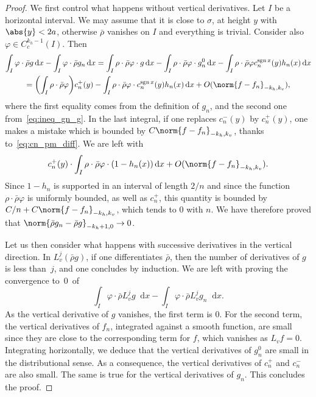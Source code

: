 \documentclass[JEP,XML,SOM,Unicode]{cedram}
\newcommand{\dd}{\mathop{}\!\mathrm{d}}
\newcommand{\paregg}[1]{\biggl(#1\biggr)}
\DeclareMathOperator{\sgn}{sgn}
\let\phi\varphi
\theoremstyle{definition}
\numberwithin{equation}{section}
\begin{document}
\begin{proof}
We first control what happens without vertical derivatives. Let $I$ be a
horizontal interval. We may assume that it is close to $\sigma$, at height
$y$ with $\abs{y}<2a$, otherwise $\bar\rho$ vanishes on $I$ and everything is
trivial. Consider also $\phi \in C^{k_h-1}_c(I)$. Then
\begin{multline*}
\int_I \phi \cdot \bar\rho g \dd x - \int_I \phi \cdot \bar\rho g_n \dd x
= \int_I \rho \cdot \bar\rho \phi \cdot g \dd x - \int_I \rho \cdot \bar\rho \phi \cdot g_n^0 \dd x
- \int_I \rho \cdot \bar\rho \phi c_n^{\sgn x}(y) h_n(x) \dd x
\\ =\paregg{\int_I \rho \cdot \bar\rho \phi} c_n^+(y) - \int_I \rho \cdot \bar\rho \phi \cdot c_n^{\sgn x}(y) h_n(x) \dd x
+ O(\norm{f-f_n}_{-k_h, k_v}),
\end{multline*}
where the first equality comes from the definition of $g_n$, and the second
one from~\eqref{eq:ineq_gn_g}. In the last integral, if one replaces
$c_n^-(y)$ by $c_n^+(y)$, one makes a mistake which is bounded by
$C\norm{f-f_n}_{-k_h, k_v}$, thanks to~\eqref{eq:cn_pm_diff}. We are left
with
\begin{equation*}
c_n^+(y) \cdot \int_I \rho \cdot \bar\rho \phi \cdot (1-h_n(x)) \dd x + O(\norm{f-f_n}_{-k_h, k_v}).
\end{equation*}
Since $1-h_n$ is supported in an interval of length $2/n$ and since the
function $\rho \cdot \bar\rho \phi$ is uniformly bounded, as well as $c_n^+$,
this quantity is bounded by $C/n + C \norm{f-f_n}_{-k_h, k_v}$, which tends
to $0$ with $n$. We have therefore proved that $\norm{\bar\rho g_n - \bar
\rho g}_{-k_h+1, 0} \to 0$.

Let us then consider what happens with successive derivatives in the vertical
direction. In $L_v^j(\bar \rho g)$, if one differentiates $\bar \rho$, then
the number of derivatives of $g$ is less than~$j$, and one concludes by
induction. We are left with proving the convergence to~$0$~of
\begin{equation*}
\int_I \phi \cdot \bar\rho L_v^j g \dd x - \int_I \phi \cdot \bar\rho L_v^j g_n \dd x.
\end{equation*}
As the vertical derivative of $g$ vanishes, the first term is $0$. For the
second term, the vertical derivatives of $f_n$, integrated against a smooth
function, are small since they are close to the corresponding term for $f$,
which vanishes as $L_v f = 0$. Integrating horizontally, we deduce that the
vertical derivatives of $g_n^0$ are small in the distributional sense. As a
consequence, the vertical derivatives of $c_n^+$ and $c_n^-$ are also small.
The same is true for the vertical derivatives of $g_n$. This concludes the
proof.
\end{proof}
\end{document}
